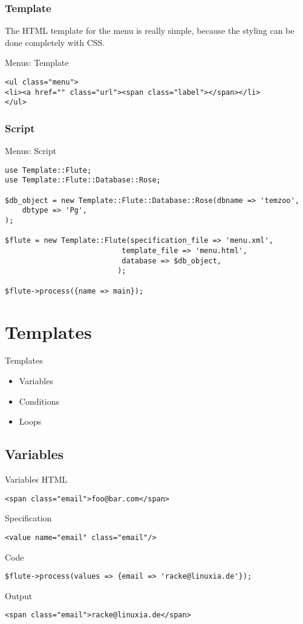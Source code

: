 \subsubsection{Template}
The HTML template for the menu is really simple, because the
styling can be done completely with CSS.

\begin{frame}[fragile]{Menus: Template}
\begin{lstlisting}
<ul class="menu">
<li><a href="" class="url"><span class="label"></span></li>
</ul>
\end{lstlisting}
\end{frame}

\subsubsection{Script}
\begin{frame}[fragile]{Menus: Script}
\begin{lstlisting}
use Template::Flute;
use Template::Flute::Database::Rose;

$db_object = new Template::Flute::Database::Rose(dbname => 'temzoo',
    dbtype => 'Pg',
);

$flute = new Template::Flute(specification_file => 'menu.xml',
						   template_file => 'menu.html',
						   database => $db_object,
						  );

$flute->process({name => main});
\end{lstlisting}
\end{frame}

\section{Templates}
\begin{frame}{Templates}
\begin{itemize}
\item Variables
\item Conditions
\item Loops
\end{itemize}
\end{frame}

\subsection{Variables}
\begin{frame}[fragile]{Variables}
HTML
\begin{lstlisting}
<span class="email">foo@bar.com</span>
\end{lstlisting}
Specification
\begin{lstlisting}
<value name="email" class="email"/>
\end{lstlisting}
Code
\begin{lstlisting}
$flute->process(values => {email => 'racke@linuxia.de'});
\end{lstlisting}
Output
\begin{lstlisting}
<span class="email">racke@linuxia.de</span>
\end{lstlisting}
\end{frame}

